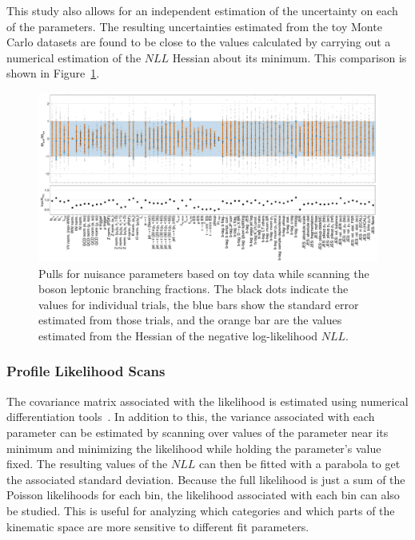 This study also allows for an independent estimation of the uncertainty on each of the parameters.  The resulting uncertainties estimated from the toy Monte Carlo datasets are found to be close to the values calculated by carrying out a numerical estimation of the $NLL$ Hessian about its minimum.  This comparison is shown in Figure~\ref{fig:analysis:method:mle:pulls_comparison}.

\begin{figure}
    \centering
    \includegraphics[width=0.9\textheight, angle=180]{chapters/Analysis/sectionStatisticalAnalysis/figures/new_pulls}
    \caption{Pulls for nuisance parameters based on toy data while scanning the \PW boson leptonic branching fractions.  The black dots indicate the values for individual trials, the blue bars show the standard error estimated from those trials, and the orange bar are the values estimated from the Hessian of the negative log-likelihood $NLL$.}
    \label{fig:analysis:method:mle:pulls_comparison}
\end{figure}


\FloatBarrier

\subsubsection{Profile Likelihood Scans}

The covariance matrix associated with the likelihood is estimated using numerical differentiation tools~\cite{numdifftools}.  In addition to this, the variance associated with each parameter can be estimated by scanning over values of the parameter near its minimum and minimizing the likelihood while holding the parameter's value fixed.  The resulting values of the $NLL$ can then be fitted with a parabola to get the associated standard deviation.  Because the full likelihood is just a sum of the Poisson likelihoods for each bin, the likelihood associated with each bin can also be studied.  This is useful for analyzing which categories and which parts of the kinematic space are more sensitive to different fit parameters.  

